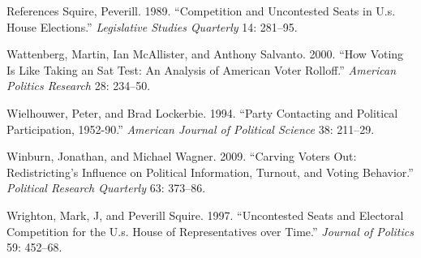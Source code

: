 \documentclass[
  ignorenonframetext,
]{beamer}
\newlength{\cslhangindent}
\newenvironment{cslreferences}%
  {\setlength{\parindent}{0pt}%
  \everypar{\setlength{\hangindent}{\cslhangindent}}\ignorespaces}%
  {\par}
\begin{document}
\begin{frame}{References}
\begin{cslreferences}
\leavevmode\hypertarget{ref-Squire1989}{}%
Squire, Peverill. 1989. ``Competition and Uncontested Seats in U.s.
House Elections.'' \emph{Legislative Studies Quarterly} 14: 281--95.

\leavevmode\hypertarget{ref-Wattenberg2000}{}%
Wattenberg, Martin, Ian McAllister, and Anthony Salvanto. 2000. ``How
Voting Is Like Taking an Sat Test: An Analysis of American Voter
Rolloff.'' \emph{American Politics Research} 28: 234--50.

\leavevmode\hypertarget{ref-Wielhouwer1994}{}%
Wielhouwer, Peter, and Brad Lockerbie. 1994. ``Party Contacting and
Political Participation, 1952-90.'' \emph{American Journal of Political
Science} 38: 211--29.

\leavevmode\hypertarget{ref-Winburn2009}{}%
Winburn, Jonathan, and Michael Wagner. 2009. ``Carving Voters Out:
Redistricting's Influence on Political Information, Turnout, and Voting
Behavior.'' \emph{Political Research Quarterly} 63: 373--86.

\leavevmode\hypertarget{ref-Wrighton1997}{}%
Wrighton, Mark, J, and Peverill Squire. 1997. ``Uncontested Seats and
Electoral Competition for the U.s. House of Representatives over Time.''
\emph{Journal of Politics} 59: 452--68.
\end{cslreferences}
\end{frame}
\end{document}
